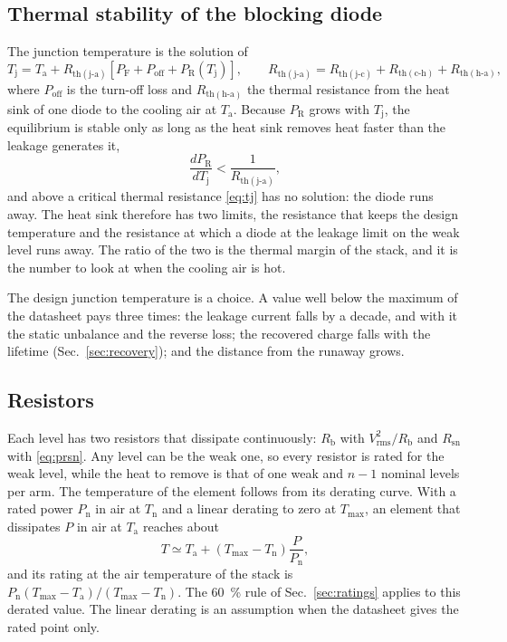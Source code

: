 \documentclass[10pt,a4paper]{scrartcl}
\newcommand{\Rsn}{R_\mathrm{sn}}
\newcommand{\Rb}{R_\mathrm{b}}
\newcommand{\Tj}{T_\mathrm{j}}
\newcommand{\Rthha}{R_\mathrm{th(h\text{-}a)}}
\begin{document}
\subsection{Thermal stability of the blocking diode}
The junction temperature is the solution of
\begin{equation}
\Tj = T_\mathrm{a} + R_\mathrm{th(j\text{-}a)}\left[P_\mathrm{F} + P_\mathrm{off} + P_\mathrm{R}(\Tj)\right], \qquad R_\mathrm{th(j\text{-}a)} = R_\mathrm{th(j\text{-}c)} + R_\mathrm{th(c\text{-}h)} + \Rthha ,
\label{eq:tj}
\end{equation}
where $P_\mathrm{off}$ is the turn-off loss and $\Rthha$ the thermal resistance from the heat sink of one diode to the cooling air at $T_\mathrm{a}$. Because $P_\mathrm{R}$ grows with $\Tj$, the equilibrium is stable only as long as the heat sink removes heat faster than the leakage generates it,
\begin{equation}
\frac{dP_\mathrm{R}}{d\Tj} < \frac{1}{R_\mathrm{th(j\text{-}a)}} ,
\label{eq:runaway}
\end{equation}
and above a critical thermal resistance \eqref{eq:tj} has no solution: the diode runs away. The heat sink therefore has two limits, the resistance that keeps the design temperature and the resistance at which a diode at the leakage limit on the weak level runs away. The ratio of the two is the thermal margin of the stack, and it is the number to look at when the cooling air is hot.

The design junction temperature is a choice. A value well below the maximum of the datasheet pays three times: the leakage current falls by a decade, and with it the static unbalance and the reverse loss; the recovered charge falls with the lifetime (Sec.~\ref{sec:recovery}); and the distance from the runaway grows.

\subsection{Resistors}
Each level has two resistors that dissipate continuously: $\Rb$ with $V_\mathrm{rms}^2/\Rb$ and $\Rsn$ with \eqref{eq:prsn}. Any level can be the weak one, so every resistor is rated for the weak level, while the heat to remove is that of one weak and $n-1$ nominal levels per arm. The temperature of the element follows from its derating curve. With a rated power $P_\mathrm{n}$ in air at $T_\mathrm{n}$ and a linear derating to zero at $T_\mathrm{max}$, an element that dissipates $P$ in air at $T_\mathrm{a}$ reaches about
\begin{equation}
T \simeq T_\mathrm{a} + \left(T_\mathrm{max} - T_\mathrm{n}\right)\frac{P}{P_\mathrm{n}} ,
\label{eq:tres}
\end{equation}
and its rating at the air temperature of the stack is $P_\mathrm{n}(T_\mathrm{max} - T_\mathrm{a})/(T_\mathrm{max} - T_\mathrm{n})$. The \SI{60}{\percent} rule of Sec.~\ref{sec:ratings} applies to this derated value. The linear derating is an assumption when the datasheet gives the rated point only.
\end{document}
